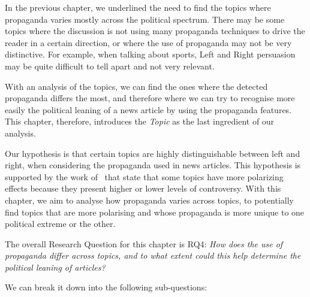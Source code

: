 In the previous chapter, we underlined the need to find the topics where propaganda varies mostly across the political spectrum. There may be some topics where the discussion is not using many propaganda techniques to drive the reader in a certain direction, or where the use of propaganda may not be very distinctive.
For example, when talking about sports, Left and Right persuasion may be quite difficult to tell apart and not very relevant. 

With an analysis of the topics, we can find the ones where the detected propaganda differs the most, and therefore where we can try to recognise more easily the political leaning of a news article by using the propaganda features.
This chapter, therefore, introduces the \emph{Topic} as the last ingredient of our analysis.

Our hypothesis is that certain topics are highly distinguishable between left and right, when considering the propaganda used in news articles.
This hypothesis is supported by the work of~\cite{garimella2018quantifying,treuillier2022being} that state that some topics have more polarizing effects because they present higher or lower levels of controversy.
With this chapter, we aim to analyse how propaganda varies across topics, to potentially find topics that are more polarising and whose propaganda is more unique to one political extreme or the other.






The overall Research Question for this chapter is RQ4: \emph{How does the use of propaganda differ across topics, and to what extent could this help determine the political leaning of articles?}

We can break it down into the following sub-questions:

